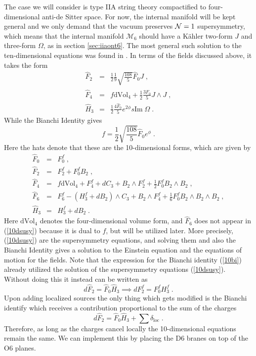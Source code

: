 \documentclass[11pt,a4paper]{article}
\numberwithin{equation}{section}
\numberwithin{table}{section}\setlength{\multlinegap}{25pt}
\newcommand{\bea}{\begin{eqnarray}}  \newcommand{\eea}{\end{eqnarray}}
\newcommand{\nn}{\nonumber}
\newcommand{\cM}{\mathcal M}
\newcommand{\be}{\begin{equation}}
\newcommand{\ee}{\end{equation}}
\begin{document}
The case we will consider is type IIA string theory compactified to four-dimensional anti-de Sitter space. For now, the internal manifold will be kept general and we only demand that the vacuum preserves ${\cal N}=1$ supersymmetry, which means that the internal manifold $\cM_6$ should have a K{\"a}hler two-form $J$ and three-form $\Omega$, as in section \ref{sec:iiaont6}. The most general such solution to the ten-dimensional equations was found in \cite{Behrndt:2004km,Lust:2004ig}. In terms of the fields discussed above, it takes the form
\bea
\hat{F}_2 &=& \frac12 \frac19 \sqrt{\frac{108}{5}} \hat{F}_0 J \;, \nn \\
\hat{F}_4 &=& f \mathrm{d Vol}_4 + \frac12 \frac{3 \hat{F}_0}{5} J \wedge J \;, \nn \\
\hat{H}_3 &=& \frac12 \frac{4 \hat{F}_0}{5} e^{2 \phi} s \mathrm{Im\;} \Omega \;.
\label{10dsusy}
\eea
While the Bianchi Identity gives
\be
f = \frac12 \sqrt{\frac{108}{5}} \hat{F}_0 e^{\phi} \;.
\label{10bi}
\ee
Here the hats denote that these are the 10-dimensional forms, which are given by
\bea
\hat{F}_0 &=& F^f_0 \;, \nn \\
\hat{F}_2 &=& F^f_2 + F_0^f B_2 \;, \nn \\
\hat{F}_4 &=& f \mathrm{d Vol}_4 + F^f_4 + dC_3 + B_2 \wedge F_2^f + \frac12 F_0^f B_2 \wedge B_2 \;, \nn \\
\hat{F}_6 &=& F^f_6 - \left( H^f_3 + d B_2 \right) \wedge C_3 + B_2 \wedge F_4^f + \frac16 F_0^f B_2\wedge B_2 \wedge B_2\;, \nn \\
\hat{H}_3 &=& H^f_3 + d B_2 \;.
\eea
Here $\mathrm{d Vol}_4$ denotes the four-dimensional volume form, and $\hat{F}_6$ does not appear in (\ref{10dsusy}) because it is dual to $f$, but will be utilized later.
More precisely, (\ref{10dsusy}) are the supersymmetry equations, and solving them and also the Bianchi Identity gives a solution to the Einstein equation and the equations of motion for the fields. Note that the expression for the Bianchi identity (\ref{10bi}) already utilized the solution of the supersymmetry equations (\ref{10dsusy}). Without doing this it instead can be written as
\be
d \hat{F}_2 = \hat{F}_0 \hat{H}_3  \implies d F_2^f = F_0^f H_3^f \;.
\label{binoloc}
\ee
Upon adding localized sources the only thing which gets modified is the Bianchi identify which receives a contribution proportional to the sum of the charges \cite{Acharya:2006ne,Koerber:2008rx}
\be
d \hat{F}_2 =  \hat{F}_0 \hat{H}_3+ \sum \delta_{\mathrm{loc}} \;.
\label{bi10dloc}
\ee
Therefore, as long as the charges cancel locally the 10-dimensional equations remain the same. We can implement this by placing the D6 branes on top of the O6 planes.
\end{document}
